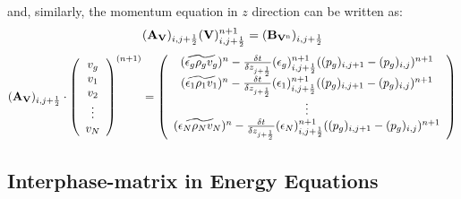 %
and, similarly, the momentum equation in $z$ direction can be written as:
%
\begin{eqnarray}
({\bf A_V})_{i,j+\frac{1}{2}} ({\bf V})_{i,j+\frac{1}{2}}^{n+1} = 
({\bf B_{V^{\rm n}}})_{i,j+\frac{1}{2}}
\nonumber
\end{eqnarray}
%
\begin{eqnarray}
({\bf A_V})_{i,j+\frac{1}{2}} \cdot \left( \begin{array}{c}
v_g \\
v_1 \\
v_2 \\
\vdots \\
v_N  \end{array} \right )^{(n+1)} = \left( \begin{array}{c}
(\widetilde {\epsilon_g \rho_g v_g})^n - 
\frac{\delta t}{\delta z_{j+\frac{1}{2}}} 
(\epsilon_g)_{i,j+\frac{1}{2}}^{n+1} ((p_g)_{i,j+1} - (p_g)_{i,j})^{n+1}     \\
(\widetilde {\epsilon_1 \rho_1 v_1})^n - 
\frac{\delta t}{\delta z_{j+\frac{1}{2}}} 
(\epsilon_1)_{i,j+\frac{1}{2}}^{n+1} ((p_g)_{i,j+1} - (p_g)_{i,j})^{n+1}     \\
\vdots       \\
(\widetilde {\epsilon_N \rho_N v_N})^n - 
\frac{\delta t}{\delta z_{j+\frac{1}{2}}}
(\epsilon_N)_{i,j+\frac{1}{2}}^{n+1} ((p_g)_{i,j+1} - (p_g)_{i,j})^{n+1}
\end{array} \right )
\nonumber
\end{eqnarray}
%
%
\newpage
\subsection{Interphase-matrix in Energy Equations}

